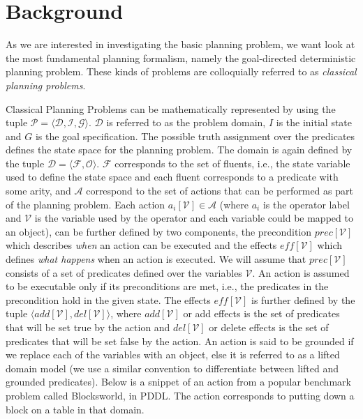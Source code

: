 \section{Background}
As we are interested in investigating the basic planning problem, we want look at the most fundamental planning formalism, namely the goal-directed deterministic planning problem. These kinds of problems are colloquially referred to as {\em classical planning problems}. 

Classical Planning Problems can be mathematically represented by using the tuple $\mathcal{P} = \langle \mathcal{D}, \mathcal{I}, \mathcal{G}\rangle$. $\mathcal{D}$ is referred to as the problem domain, $I$ is the initial state and $G$ is the goal specification. The possible truth assignment over the predicates defines the state space for the planning problem.
The domain is again defined by the tuple $\mathcal{D} = \langle \mathcal{F}, \mathcal{O}\rangle$.  $\mathcal{F}$ corresponds to the set of fluents, i.e., the state variable used to define the state space and each fluent corresponds to a predicate with some arity, and  $\mathcal{A}$ correspond to the set of actions that can be performed as part of the planning problem. Each action $a_i[\mathcal{V}] \in \mathcal{A}$ (where $a_i$ is the operator label and $\mathcal{V}$ is the variable used by the operator and each variable could be mapped to an object), can be further defined by two components, the precondition $prec[\mathcal{V}]$ which describes \textit{when} an action can be executed and the effects $eff[\mathcal{V}]$ which defines \textit{what happens} when an action is executed. We will assume that $prec[\mathcal{V}]$ consists of a set of predicates defined over the variables $\mathcal{V}$. An action is assumed to be executable only if its preconditions are met, i.e., the predicates in the precondition hold in the given state.
The effects $eff[\mathcal{V}]$ is further defined by the tuple $\langle add[\mathcal{V}], del[\mathcal{V}] \rangle$, where $add[\mathcal{V}]$ or add effects is the set of predicates that will be set true by the action and $del[\mathcal{V}]$ or delete effects is the set of predicates that will be set false by the action. 
An action is said to be grounded if we replace each of the variables with an object, else it is referred to as a lifted domain model (we use a similar convention to differentiate between lifted and grounded predicates).
Below is a snippet of an action from a popular benchmark problem called Blocksworld, in PDDL. The action corresponds to putting down a block on a table in that domain. 

